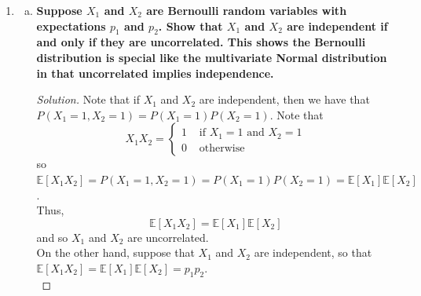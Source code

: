 \documentclass[11pt]{article}
\newenvironment{solution}
  {\renewcommand\qedsymbol{$\blacksquare$}\begin{proof}[Solution]}
  {\end{proof}}
\begin{document}
\begin{enumerate}
\begin{enumerate}[a)]
      \begin{solution}
      Note that
      \[
        \mathbb{E}\left[XY \right] = \int_0^1 \int_{-x}^x xy I(0 < x < 1, -x < y < x) \, dy \, dx = 0
      \]
      by symmetry. Similarly,
      \[
        \mathbb{E}\left[X \right] = \int_0^1 x(2x) \, dx = 1
      \]
      and 
      \[
        \mathbb{E}\left[Y \right] = \int_{-1}^1 y(1 - |y|) \, dy = 0
      \]
      by symmetry. Thus, we have that
      \[
        \mathbb{E}\left[XY \right] - \mathbb{E}\left[X \right] \mathbb{E}\left[Y \right] = 0
      \]
      so $X$ and $Y$ are uncorrelated, as desired.
      \end{solution}
    
    \end{enumerate}

    \newpage
    \item 
    \begin{enumerate}[a)]
      \item \textbf{Suppose $X_1$ and $X_2$ are Bernoulli random variables with expectations $p_1$ and $p_2$. Show that $X_1$ and $X_2$ are independent if and only if they are uncorrelated.
      This shows the Bernoulli distribution is special like the multivariate Normal distribution in that uncorrelated implies independence.}
      
      \begin{solution}
      Note that if $X_1$ and $X_2$ are independent, then we have that $P(X_1 = 1, X_2 = 1) = P(X_1 = 1)P(X_2 = 1)$. Note that
      \[
        X_1 X_2 = \begin{cases}
          1 &\text{ if $X_1 = 1$ and $X_2 = 1$}  \\
          0 &\text{ otherwise}
        \end{cases}
      \]
      so $\mathbb{E}\left[X_1 X_2 \right] = P(X_1 = 1, X_2 = 1) = P(X_1 = 1)P(X_2 = 1) = \mathbb{E}\left[X_1 \right]\mathbb{E}\left[X_2 \right]$. \\
      
      Thus,
      \[
        \mathbb{E}\left[X_1 X_2 \right] = \mathbb{E}\left[X_1 \right] \mathbb{E}\left[X_2 \right] 
      \]
      and so $X_1$ and $X_2$ are uncorrelated. \\

      On the other hand, suppose that $X_1$ and $X_2$ are independent, so that $\mathbb{E}\left[X_1 X_2 \right] = \mathbb{E}\left[X_1 \right] \mathbb{E}\left[X_2 \right] = p_1 p_2$. \\


\end{solution}
\end{enumerate}
\end{enumerate}
\end{document}
